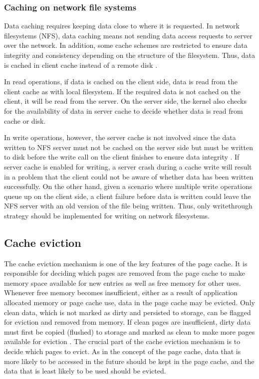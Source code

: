 \subsubsection{Caching on network file systems}

Data caching requires keeping data close to where it is requested. 
In network filesystems (NFS), data caching means not sending data access 
requests to server over the network. 
In addition, some cache schemes are restricted to ensure data integrity and 
consistency depending on the structure of the filesystem.
Thus, data is cached in client cache instead of a remote disk 
\cite{eisler2001managing}. 

In read operations, if data is cached on the client side, data is read from the 
client cache as with local filesystem. If the required data is not cached on the 
client, it will be read from the server. On the server side, the kernel also checks 
for the availability of data in server cache to decide whether data is read from 
cache or disk. 

In write operations, however, the server cache is not involved since the data 
written to NFS server must not be cached on the server side but must be written 
to disk before the write call on the client finishes to ensure data integrity . 
If server cache is enabled for writing, a server crash during a cache 
write will result in a problem that the client could not be aware of whether 
data has been written successfully. 
On the other hand, given a scenario where multiple write operations queue up 
on the client side, a client failure before data is written could leave the NFS 
server with an old version of the file being written. 
Thus, only writethrough strategy should be implemented for writing on 
network filesystems. 

\subsection{Cache eviction}

The cache eviction mechanism is one of the key features of the
page cache. 
It is responsible for deciding which pages are removed from the 
page cache to make memory space available for new entries as well as 
free memory for other uses. 
Whenever free memory becomes insufficient, either as a result of application 
allocated memory or page cache use, data in the page cache may be evicted. 
Only clean data, which is not marked as dirty and persisted to storage, 
can be flagged for eviction and removed from memory. 
If clean pages are insufficient, dirty data must first be copied (flushed) 
to storage and marked as clean to make more pages available for eviction 
\cite{linuxdev3rd2010,bovet2005understanding}. 
The crucial part of the cache eviction mechanism is to decide which pages 
to evict. As in the concept of the page cache, data that is more likely 
to be accessed in the future should be kept in the page cache, and the data 
that is least likely to be used should be evicted. 

